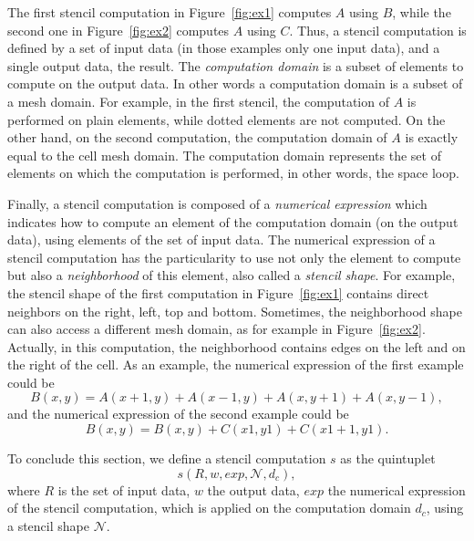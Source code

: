 
The first stencil computation in Figure~\ref{fig:ex1} computes $A$ using $B$, while the second one in Figure~\ref{fig:ex2} computes $A$ using $C$. Thus, a stencil computation is defined by a set of input data (in those examples only one input data), and a single output data, the result. The \emph{computation domain} is a subset of elements to compute on the output data. In other words a computation domain is a subset of a mesh domain. For example, in the first stencil, the computation of $A$ is performed on plain elements, while dotted elements are not computed. On the other hand, on the second computation, the computation domain of $A$ is exactly equal to the cell mesh domain. The computation domain represents the set of elements on which the computation is performed, in other words, the space loop.

Finally, a stencil computation is composed of a \emph{numerical expression} which indicates how to compute an element of the computation domain (on the output data), using elements of the set of input data. The numerical expression of a stencil computation has the particularity to use not only the element to compute but also a \emph{neighborhood} of this element, also called a \emph{stencil shape}. For example, the stencil shape of the first computation in Figure~\ref{fig:ex1} contains direct neighbors on the right, left, top and bottom. Sometimes, the neighborhood shape can also access a different mesh domain, as for example in Figure~\ref{fig:ex2}. Actually, in this computation, the neighborhood contains edges on the left and on the right of the cell. As an example, the numerical expression of the first example could be
\begin{equation*} 
B(x,y) = A(x+1,y)+A(x-1,y)+A(x,y+1)+A(x,y-1),
\end{equation*}
and the numerical expression of the second example could be
\begin{equation*} 
B(x,y) = B(x,y)+C(x1,y1)+C(x1+1,y1).
\end{equation*}

To conclude this section, we define a stencil computation $s$ as the quintuplet
\begin{equation} 
s(R,w,exp,\mathcal{N},d_c),
\label{eq:st}
\end{equation}
where $R$ is the set of input data, $w$ the output data, $exp$ the numerical expression of the stencil computation, which is applied on the computation domain $d_c$, using a stencil shape $\mathcal{N}$.

